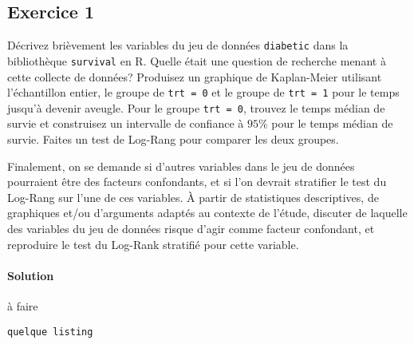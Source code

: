 \documentclass[../main.tex]{subfiles}
\begin{document}
\begin{CJK*}{UTF8}{gbsn}
\section*{Exercice 1}
Décrivez brièvement les variables du jeu de données 
\texttt{diabetic} dans la bibliothèque \texttt{survival} en R.
Quelle était une question de recherche menant à cette collecte de données?
Produisez un graphique de Kaplan-Meier utilisant l'échantillon entier,
le groupe de \texttt{trt = 0} et le groupe de \texttt{trt = 1} 
pour le temps jusqu'à devenir aveugle.
Pour le groupe \texttt{trt = 0}, trouvez le temps médian de survie et
construisez un intervalle de confiance à $95\%$ pour le temps médian de survie.
Faites un test de Log-Rang pour comparer les deux groupes.

Finalement, on se demande si d'autres variables
dans le jeu de données pourraient être des facteurs confondants, et si l'on devrait stratifier le
test du Log-Rang sur l'une de ces variables. À partir de statistiques descriptives, de graphiques
et/ou d'arguments adaptés au contexte de l'étude, discuter de laquelle des variables du jeu de
données risque d'agir comme facteur confondant, et reproduire le test du Log-Rank stratifié pour cette variable.

\paragraph{Solution}

à faire

\begin{lstlisting}
quelque listing

\end{lstlisting}

\end{CJK*}
\end{document}

